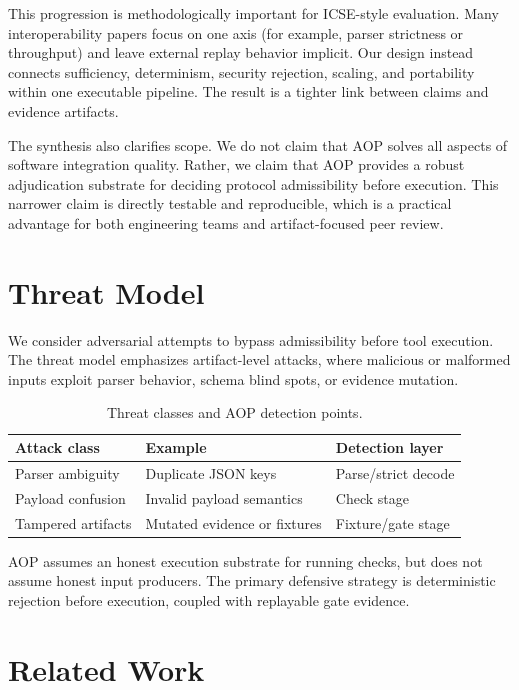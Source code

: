 \documentclass[10pt,conference]{IEEEtran}
\begin{document}
This progression is methodologically important for ICSE-style evaluation. Many
interoperability papers focus on one axis (for example, parser strictness or
throughput) and leave external replay behavior implicit. Our design instead
connects sufficiency, determinism, security rejection, scaling, and portability
within one executable pipeline. The result is a tighter link between claims and
evidence artifacts.

The synthesis also clarifies scope. We do not claim that AOP solves all aspects
of software integration quality. Rather, we claim that AOP provides a robust
adjudication substrate for deciding protocol admissibility before execution.
This narrower claim is directly testable and reproducible, which is a practical
advantage for both engineering teams and artifact-focused peer review.



\section{Threat Model}

We consider adversarial attempts to bypass admissibility before tool execution.
The threat model emphasizes artifact-level attacks, where malicious or malformed
inputs exploit parser behavior, schema blind spots, or evidence mutation.

\begin{table}[t]
\centering
\caption{Threat classes and AOP detection points.}
\begin{tabular}{lll}
\toprule
Attack class & Example & Detection layer \\
\midrule
Parser ambiguity & Duplicate JSON keys & Parse/strict decode \\
Payload confusion & Invalid payload semantics & Check stage \\
Tampered artifacts & Mutated evidence or fixtures & Fixture/gate stage \\
\bottomrule
\end{tabular}
\end{table}

AOP assumes an honest execution substrate for running checks, but does not
assume honest input producers. The primary defensive strategy is deterministic
rejection before execution, coupled with replayable gate evidence.

\section{Related Work}
\end{document}
